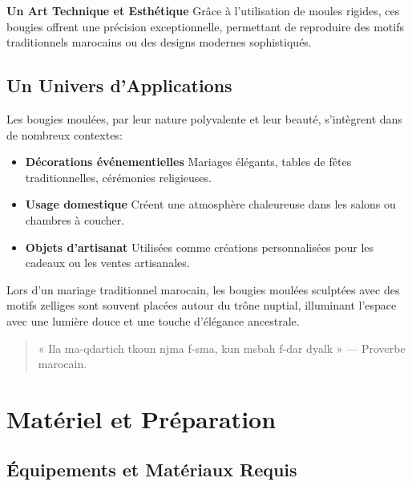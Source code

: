 \documentclass[11pt,fleqn,onecolumn,oneside]{book}
\begin{document}
\begin{remark}
\textbf{Un Art Technique et Esthétique} Grâce à l’utilisation de moules rigides, ces bougies offrent une précision exceptionnelle, permettant de reproduire des motifs traditionnels marocains ou des designs modernes sophistiqués.
\end{remark}

\subsection*{Un Univers d’Applications}

Les bougies moulées, par leur nature polyvalente et leur beauté, s’intègrent dans de nombreux contextes:
\begin{itemize}
    \item \textbf{Décorations événementielles} Mariages élégants, tables de fêtes traditionnelles, cérémonies religieuses.
    \item \textbf{Usage domestique} Créent une atmosphère chaleureuse dans les salons ou chambres à coucher.
    \item \textbf{Objets d'artisanat} Utilisées comme créations personnalisées pour les cadeaux ou les ventes artisanales.
\end{itemize}

\begin{example}
Lors d'un mariage traditionnel marocain, les bougies moulées sculptées avec des motifs zelliges sont souvent placées autour du trône nuptial, illuminant l'espace avec une lumière douce et une touche d'élégance ancestrale.
\end{example}


\begin{quote}
« Ila ma-qdartich tkoun njma f-sma, kun msbah f-dar dyalk » — Proverbe marocain.
\end{quote}

\section{Matériel et Préparation}

\subsection*{Équipements et Matériaux Requis}
\end{document}
